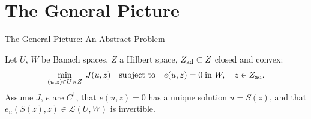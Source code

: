 \documentclass[main.tex]{subfiles}
\begin{document}
\section{The General Picture}

\begin{frame}[label=general]{The General Picture: An Abstract Problem}
  \begin{hlbox}
    Let $U$, $W$ be Banach spaces, $Z$ a Hilbert space, $Z_{\rm ad} \subset Z$ closed and convex:
    \[
      \min_{(u,z) \in U \times Z}\; J(u,z) \quad\text{subject to}\quad e(u,z) = 0 \;\text{in } W, \quad z \in Z_{\rm ad}.
    \]
    Assume $J$, $e$ are $C^1$, that $e(u,z) = 0$ has a unique solution $u = S(z)$, and that $e_u(S(z),z) \in \mathcal{L}(U,W)$ is invertible.
  \end{hlbox}


  \vfill\hfill\hyperlink{abstract}{}
\end{frame}
\end{document}

